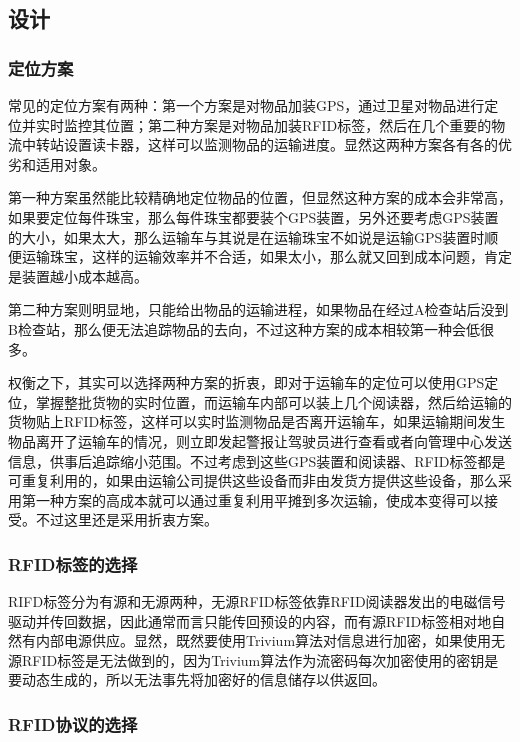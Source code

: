 \subsection{设计}

\subsubsection{定位方案}

常见的定位方案有两种：第一个方案是对物品加装GPS，通过卫星对物品进行定位并实时监控其位置；第二种方案是对物品加装RFID标签，然后在几个重要的物流中转站设置读卡器，这样可以监测物品的运输进度。显然这两种方案各有各的优劣和适用对象。

第一种方案虽然能比较精确地定位物品的位置，但显然这种方案的成本会非常高，如果要定位每件珠宝，那么每件珠宝都要装个GPS装置，另外还要考虑GPS装置的大小，如果太大，那么运输车与其说是在运输珠宝不如说是运输GPS装置时顺便运输珠宝，这样的运输效率并不合适，如果太小，那么就又回到成本问题，肯定是装置越小成本越高。

第二种方案则明显地，只能给出物品的运输进程，如果物品在经过A检查站后没到B检查站，那么便无法追踪物品的去向，不过这种方案的成本相较第一种会低很多。

权衡之下，其实可以选择两种方案的折衷，即对于运输车的定位可以使用GPS定位，掌握整批货物的实时位置，而运输车内部可以装上几个阅读器，然后给运输的货物贴上RFID标签，这样可以实时监测物品是否离开运输车，如果运输期间发生物品离开了运输车的情况，则立即发起警报让驾驶员进行查看或者向管理中心发送信息，供事后追踪缩小范围。不过考虑到这些GPS装置和阅读器、RFID标签都是可重复利用的，如果由运输公司提供这些设备而非由发货方提供这些设备，那么采用第一种方案的高成本就可以通过重复利用平摊到多次运输，使成本变得可以接受。不过这里还是采用折衷方案。

\subsubsection{RFID标签的选择}

RIFD标签分为有源和无源两种，无源RFID标签依靠RFID阅读器发出的电磁信号驱动并传回数据，因此通常而言只能传回预设的内容，而有源RFID标签相对地自然有内部电源供应。显然，既然要使用Trivium算法对信息进行加密，如果使用无源RFID标签是无法做到的，因为Trivium算法作为流密码每次加密使用的密钥是要动态生成的，所以无法事先将加密好的信息储存以供返回。

\subsubsection{RFID协议的选择}

